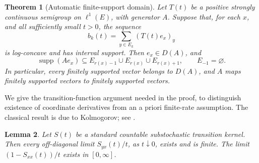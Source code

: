 \documentclass[reqno]{amsart}
\newtheorem{theorem}{Theorem}[section]
\newtheorem{lemma}[theorem]{Lemma}
\theoremstyle{definition}
\theoremstyle{remark}
\DeclareMathOperator{\supp}{supp}
\begin{document}
\begin{theorem}[Automatic finite-support domain]\label{ana:domain}
Let \(T(t)\) be a positive strongly continuous semigroup on \(\ell^1(E)\),
with generator \(A\).  Suppose that, for each \(x\), and all sufficiently small
\(t>0\), the sequence
\[
 b_k(t)=\sum_{y\in E_k}(T(t)e_x)_y
\]
is log-concave and has interval support.  Then \(e_x\in D(A)\), and
\[
 \supp(Ae_x)\subseteq E_{r(x)-1}\cup E_{r(x)}\cup E_{r(x)+1},
 \qquad E_{-1}=\varnothing .
\]
In particular, every finitely supported vector belongs to \(D(A)\), and
\(A\) maps finitely supported vectors to finitely supported vectors.
\end{theorem}

We give the transition-function argument needed in the proof, to distinguish
existence of coordinate derivatives from an a priori finite-rate assumption.
The classical result is due to Kolmogorov; see \cite{Chung67,Kendall55}.

\begin{lemma}\label{ana:transition-derivatives}
Let \(S(t)\) be a standard countable substochastic transition kernel.  Then
every off-diagonal limit \(S_{yx}(t)/t\), as \(t\downarrow0\), exists and is
finite.  The limit \((1-S_{xx}(t))/t\) exists in \([0,\infty]\).
\end{lemma}
\end{document}
